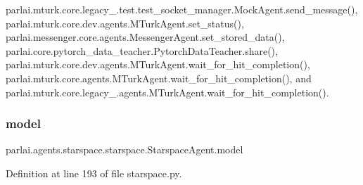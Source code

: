 parlai.\+mturk.\+core.\+legacy\+\_.\+test.\+test\+\_\+socket\+\_\+manager.\+Mock\+Agent.\+send\+\_\+message(), parlai.\+mturk.\+core.\+dev.\+agents.\+M\+Turk\+Agent.\+set\+\_\+status(), parlai.\+messenger.\+core.\+agents.\+Messenger\+Agent.\+set\+\_\+stored\+\_\+data(), parlai.\+core.\+pytorch\+\_\+data\+\_\+teacher.\+Pytorch\+Data\+Teacher.\+share(), parlai.\+mturk.\+core.\+dev.\+agents.\+M\+Turk\+Agent.\+wait\+\_\+for\+\_\+hit\+\_\+completion(), parlai.\+mturk.\+core.\+agents.\+M\+Turk\+Agent.\+wait\+\_\+for\+\_\+hit\+\_\+completion(), and parlai.\+mturk.\+core.\+legacy\+\_.\+agents.\+M\+Turk\+Agent.\+wait\+\_\+for\+\_\+hit\+\_\+completion().

\mbox{\label{classparlai_1_1agents_1_1starspace_1_1starspace_1_1StarspaceAgent_a1bf1dacfd9d58385bd7da5bcd574cb0f}} 
\subsubsection{\texorpdfstring{model}{model}}
{\footnotesize\ttfamily parlai.\+agents.\+starspace.\+starspace.\+Starspace\+Agent.\+model}



Definition at line 193 of file starspace.\+py.



